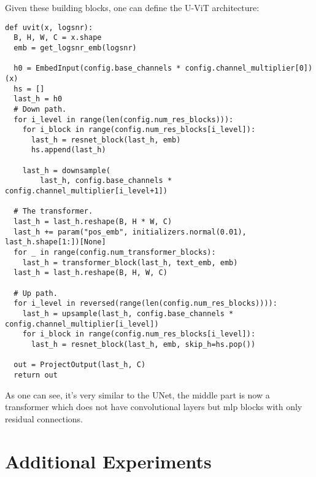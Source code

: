 \documentclass[nohyperref]{article}
\theoremstyle{plain}
\theoremstyle{definition}
\theoremstyle{remark}
\begin{document}
Given these building blocks, one can define the U-ViT architecture:
\begin{lstlisting}[style=python]
def uvit(x, logsnr):
  B, H, W, C = x.shape
  emb = get_logsnr_emb(logsnr)

  h0 = EmbedInput(config.base_channels * config.channel_multiplier[0])(x)
  hs = []
  last_h = h0
  # Down path.
  for i_level in range(len(config.num_res_blocks))):
    for i_block in range(config.num_res_blocks[i_level]):
      last_h = resnet_block(last_h, emb)
      hs.append(last_h)

    last_h = downsample(
        last_h, config.base_channels * config.channel_multiplier[i_level+1])
  
  # The transformer.
  last_h = last_h.reshape(B, H * W, C)
  last_h += param("pos_emb", initializers.normal(0.01), last_h.shape[1:])[None]
  for _ in range(config.num_transformer_blocks):
    last_h = transformer_block(last_h, text_emb, emb)
  last_h = last_h.reshape(B, H, W, C)

  # Up path.
  for i_level in reversed(range(len(config.num_res_blocks)))):
    last_h = upsample(last_h, config.base_channels * config.channel_multiplier[i_level])
    for i_block in range(config.num_res_blocks[i_level]):
      last_h = resnet_block(last_h, emb, skip_h=hs.pop())
  
  out = ProjectOutput(last_h, C)
  return out
\end{lstlisting}


As one can see, it's very similar to the UNet, the middle part is now a transformer which does not have convolutional layers but mlp blocks with only residual connections.



 

\newpage\section{Additional Experiments}
\label{app:additional_exps}
\end{document}

